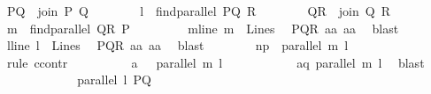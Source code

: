 \begin{isabellebody}
\ {\isacharquery}{\kern0pt}PQ\ {\isacharequal}{\kern0pt}{\isachardoublequoteopen}\ join\ P\ Q{\isachardoublequoteclose}\isanewline
\ \ \ \ \ \ \isamarkupfalse%
\ {\isacharquery}{\kern0pt}l\ {\isacharequal}{\kern0pt}\ {\isachardoublequoteopen}find{\isacharunderscore}{\kern0pt}parallel\ {\isacharquery}{\kern0pt}PQ\ R{\isachardoublequoteclose}\isanewline
\ \ \ \ \ \ \isamarkupfalse%
\ {\isacharquery}{\kern0pt}QR\ {\isacharequal}{\kern0pt}\ {\isachardoublequoteopen}join\ Q\ R{\isachardoublequoteclose}\isanewline
\ \ \ \ \ \ \isamarkupfalse%
\ {\isacharquery}{\kern0pt}m\ {\isacharequal}{\kern0pt}\ {\isachardoublequoteopen}find{\isacharunderscore}{\kern0pt}parallel\ {\isacharquery}{\kern0pt}QR\ P{\isachardoublequoteclose}\ \isanewline
\ \ \ \ \ \ \isamarkupfalse%
\ mline{\isacharcolon}{\kern0pt}\ {\isachardoublequoteopen}{\isacharquery}{\kern0pt}m\ {\isasymin}\ Lines{\isachardoublequoteclose}\ \isamarkupfalse%
\ PQR\ a{}a\ a{}a\ \isamarkupfalse%
\ blast\isanewline
\ \ \ \ \ \ \isamarkupfalse%
\ lline{\isacharcolon}{\kern0pt}\ {\isachardoublequoteopen}{\isacharquery}{\kern0pt}l\ {\isasymin}\ Lines{\isachardoublequoteclose}\ \isamarkupfalse%
\ PQR\ a{}a\ a{}a\ \isamarkupfalse%
\ blast\isanewline
\ \ \ \ \ \ \isamarkupfalse%
\ np{\isacharcolon}{\kern0pt}\ {\isachardoublequoteopen}{\isasymnot}\ parallel\ {\isacharquery}{\kern0pt}m\ {\isacharquery}{\kern0pt}l{\isachardoublequoteclose}\ \isanewline
\ \ \ \ \ \ \isamarkupfalse%
\ {\isacharparenleft}{\kern0pt}rule\ ccontr{\isacharparenright}{\kern0pt}\isanewline
\ \ \ \ \ \ \ \ \isamarkupfalse%
\ a{\isacharcolon}{\kern0pt}\ {\isachardoublequoteopen}{\isasymnot}\ {\isasymnot}\ parallel\ {\isacharquery}{\kern0pt}m\ {\isacharquery}{\kern0pt}l{\isachardoublequoteclose}\isanewline
\ \ \ \ \ \ \ \ \isamarkupfalse%
\ \isamarkupfalse%
\ aq{\isacharcolon}{\kern0pt}\ {\isachardoublequoteopen}parallel\ {\isacharquery}{\kern0pt}m\ {\isacharquery}{\kern0pt}l{\isachardoublequoteclose}\ \isamarkupfalse%
\ blast\isanewline
\ \ \ \ \ \ \ \ \isamarkupfalse%
\ \isamarkupfalse%
\ {}{\isacharcolon}{\kern0pt}\ {\isachardoublequoteopen}parallel\ {\isacharquery}{\kern0pt}l\ {\isacharquery}{\kern0pt}PQ{\isachardoublequoteclose}\ \ \isamarkupfalse%

\end{isabellebody}
